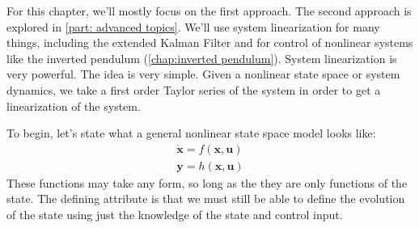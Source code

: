 For this chapter, we'll mostly focus on the first approach. The second approach is explored in \autoref{part: advanced topics}. We'll use system linearization for many things, including the extended Kalman Filter and for control of nonlinear systems like the inverted pendulum (\autoref{chap:inverted pendulum}). System linearization is very powerful. The idea is very simple. Given a nonlinear state space or system dynamics, we take a first order Taylor series of the system in order to get a linearization of the system.

To begin, let's state what a general nonlinear state space model looks like:
\begin{gather}
\bm{\dot{x}}=f(\bm{x},\bm{u})\\
\bm{y}=h(\bm{x},\bm{u})
\end{gather}
These functions may take any form, so long as the they are only functions of the state. The defining attribute is that we must still be able to define the evolution of the state using just the knowledge of the state and control input.

